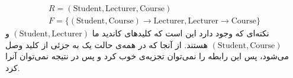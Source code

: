 \begin{gather*}
    R = (\text{Student}, \text{Lecturer}, \text{Course})\\
    F = \{(\text{Student}, \text{Course}) \rightarrow \text{Lecturer}, \text{Lecturer} \rightarrow \text{Course}\}
\end{gather*}
نکته‌ای که وجود دارد این است که کلید‌های کاندید ما
$(\text{Student}, \text{Lecturer})$
و
$(\text{Student}, \text{Course})$
هستند. از آنجا که در همه‌ی حالت یک
به جزئی از کلید وصل می‌شود، پس این رابطه را نمی‌توان تجزیه‌ی خوب کرد و پس در نتیجه نمی‌توان آنرا
کرد.